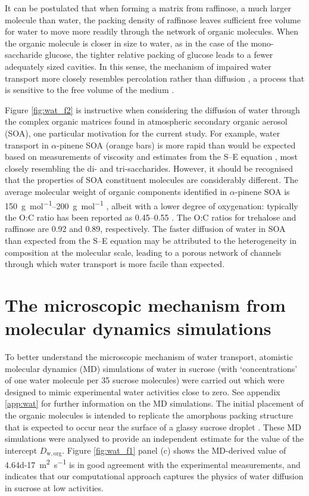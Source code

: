 It can be postulated that when forming a matrix from raffinose, a much larger molecule than water, the packing density of raffinose leaves sufficient free volume for water to move more readily through the network of organic molecules. When the organic molecule is closer in size to water, as in the case of the mono-saccharide glucose, the tighter relative packing of glucose leads to a fewer adequately sized cavities. In this sense, the mechanism of impaired water transport more closely resembles percolation rather than diffusion \cite{Shante1971,Shiraiwa2011}, a process that is sensitive to the free volume of the medium \cite{White2016}.

Figure \ref{fig:wat_f2} is instructive when considering the diffusion of water through the complex organic matrices found in atmospheric secondary organic aerosol (SOA), one particular motivation for the current study. For example, water transport in $\alpha$-pinene SOA (orange bars) is more rapid than would be expected based on measurements of viscosity and estimates from the S–E equation \cite{powerTransitionLiquidSolidlike2013,Molinero2005,Price2015}, most closely resembling the di- and tri-saccharides. However, it should be recognised that the properties of SOA constituent molecules are considerably different. The average molecular weight of organic components identified in $\alpha$-pinene SOA is \SIrange{150}{200}{\gram\per\mole} \cite{Chen2013}, albeit with a lower degree of oxygenation: typically the O:C ratio has been reported as \numrange{0.45}{0.55} \cite{zhang2015formation}. The O:C ratios for trehalose and raffinose are \num{0.92} and \num{0.89}, respectively. The faster diffusion of water in SOA than expected from the S–E equation may be attributed to the heterogeneity in composition at the molecular scale, leading to a porous network of channels through which water transport is more facile than expected.

\section{The microscopic mechanism from molecular dynamics simulations}\label{sec:wat_mech}

To better understand the microscopic mechanism of water transport, atomistic molecular dynamics (MD) simulations of water in sucrose (with ‘concentrations’ of one water molecule per \num{35} sucrose molecules) were carried out which were designed to mimic experimental water activities close to zero. See appendix \ref{app:wat} for further information on the MD simulations. The initial placement of the organic molecules is intended to replicate the amorphous packing structure that is expected to occur near the surface of a glassy sucrose droplet \cite{Mikhailov2009a}. These MD simulations were analysed to provide an independent estimate for the value of the intercept $D_{\mathrm{w,org}}$. Figure \ref{fig:wat_f1} panel (c) shows the MD-derived value of \SI{4.64d-17}{\meter\squared\per\second} is in good agreement with the experimental measurements, and indicates that our computational approach captures the physics of water diffusion in sucrose at low activities.

